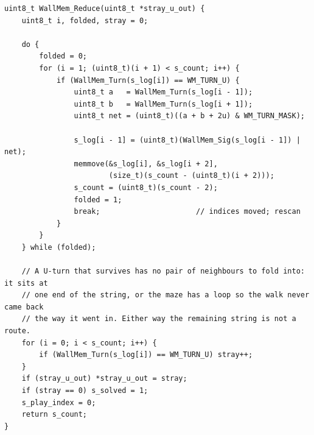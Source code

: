 \documentclass[11pt,a4paper]{article}
\theoremstyle{plain}
\theoremstyle{definition}
\begin{document}
\begin{lstlisting}[firstnumber=62]
uint8_t WallMem_Reduce(uint8_t *stray_u_out) {
    uint8_t i, folded, stray = 0;

    do {
        folded = 0;
        for (i = 1; (uint8_t)(i + 1) < s_count; i++) {
            if (WallMem_Turn(s_log[i]) == WM_TURN_U) {
                uint8_t a   = WallMem_Turn(s_log[i - 1]);
                uint8_t b   = WallMem_Turn(s_log[i + 1]);
                uint8_t net = (uint8_t)((a + b + 2u) & WM_TURN_MASK);

                s_log[i - 1] = (uint8_t)(WallMem_Sig(s_log[i - 1]) | net);
                memmove(&s_log[i], &s_log[i + 2],
                        (size_t)(s_count - (uint8_t)(i + 2)));
                s_count = (uint8_t)(s_count - 2);
                folded = 1;
                break;                      // indices moved; rescan
            }
        }
    } while (folded);

    // A U-turn that survives has no pair of neighbours to fold into: it sits at
    // one end of the string, or the maze has a loop so the walk never came back
    // the way it went in. Either way the remaining string is not a route.
    for (i = 0; i < s_count; i++) {
        if (WallMem_Turn(s_log[i]) == WM_TURN_U) stray++;
    }
    if (stray_u_out) *stray_u_out = stray;
    if (stray == 0) s_solved = 1;
    s_play_index = 0;
    return s_count;
}
\end{lstlisting}
\end{document}
